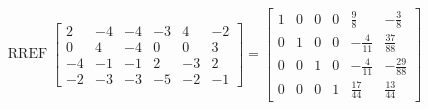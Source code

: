 \begin{exerciseAnswer} 


\[\operatorname{RREF} \left[\begin{array}{cccccc}
2 & -4 & -4 & -3 & 4 & -2 \\
0 & 4 & -4 & 0 & 0 & 3 \\
-4 & -1 & -1 & 2 & -3 & 2 \\
-2 & -3 & -3 & -5 & -2 & -1
\end{array}\right] = \left[\begin{array}{cccccc}
1 & 0 & 0 & 0 & \frac{9}{8} & -\frac{3}{8} \\
0 & 1 & 0 & 0 & -\frac{4}{11} & \frac{37}{88} \\
0 & 0 & 1 & 0 & -\frac{4}{11} & -\frac{29}{88} \\
0 & 0 & 0 & 1 & \frac{17}{44} & \frac{13}{44}
\end{array}\right] \]



\end{exerciseAnswer}
